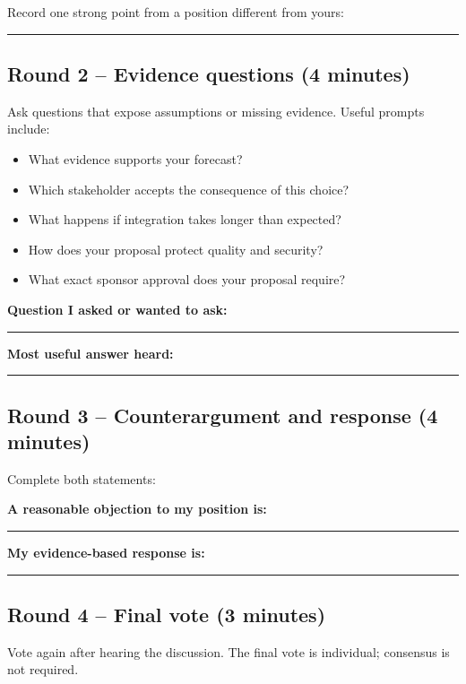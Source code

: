 \documentclass[11pt,a4paper]{article}
\newcommand{\blankline}{\rule{\linewidth}{0.35pt}}
\begin{document}
Record one strong point from a position different from yours:

\vspace{8mm}\blankline

\subsection*{Round 2 -- Evidence questions (4 minutes)}

Ask questions that expose assumptions or missing evidence. Useful prompts include:

\begin{itemize}
  \item What evidence supports your forecast?
  \item Which stakeholder accepts the consequence of this choice?
  \item What happens if integration takes longer than expected?
  \item How does your proposal protect quality and security?
  \item What exact sponsor approval does your proposal require?
\end{itemize}

\textbf{Question I asked or wanted to ask:}

\vspace{7mm}\blankline

\textbf{Most useful answer heard:}

\vspace{7mm}\blankline

\subsection*{Round 3 -- Counterargument and response (4 minutes)}

Complete both statements:

\textbf{A reasonable objection to my position is:}

\vspace{7mm}\blankline

\textbf{My evidence-based response is:}

\vspace{7mm}\blankline

\subsection*{Round 4 -- Final vote (3 minutes)}

Vote again after hearing the discussion. The final vote is individual; consensus is not required.
\end{document}
